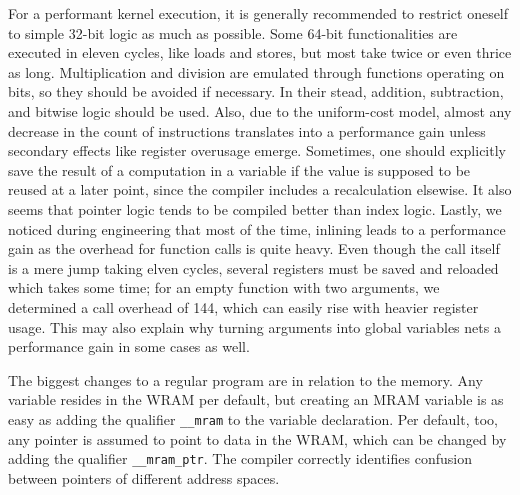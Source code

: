 For a performant kernel execution, it is generally recommended to restrict oneself to simple 32-bit logic as much as possible.
Some 64-bit functionalities are executed in eleven cycles, like loads and stores, but most take twice or even thrice as long.
Multiplication and division are emulated through functions operating on bits, so they should be avoided if necessary.
In their stead, addition, subtraction, and bitwise logic should be used.
Also, due to the uniform-cost model, almost any decrease in the count of instructions translates into a performance gain unless secondary effects like register overusage\todo{!} emerge.
Sometimes, one should explicitly save the result of a computation in a variable if the value is supposed to be reused at a later point, since the compiler includes a recalculation elsewise.
It also seems that pointer logic tends to be compiled better than index logic.
Lastly, we noticed during engineering that most of the time, inlining leads to a performance gain as the overhead for function calls is quite heavy.
Even though the call itself is a mere jump taking elven cycles, several registers must be saved and reloaded which takes some time;
for an empty function with two arguments, we determined a call overhead of \qty{144}{\cycles}, which can easily rise with heavier register usage.
This may also explain why turning arguments into global variables nets a performance gain in some cases as well.

The biggest changes to a regular program are in relation to the memory.
Any variable resides in the \ac{WRAM} per default, but creating an \ac{MRAM} variable is as easy as adding the qualifier \lstinline|__mram| to the variable declaration.
Per default, too, any pointer is assumed to point to data in the \ac{WRAM}, which can be changed by adding the qualifier \lstinline|__mram_ptr|.
The compiler correctly identifies confusion between pointers of different address spaces.

